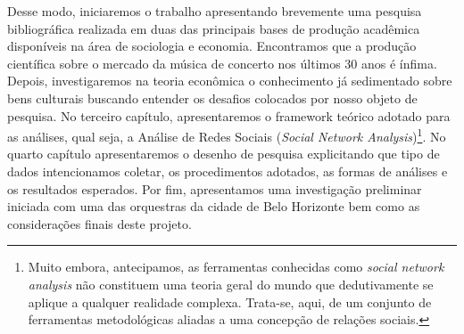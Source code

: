 \documentclass[a4paper, 12pt, openright, oneside, german, french, english, brazil]{abntex2}
\begin{document}
	Desse modo, iniciaremos o trabalho apresentando brevemente uma pesquisa bibliográfica realizada em duas das principais bases de produção acadêmica disponíveis na área de sociologia e economia. Encontramos que a produção científica sobre o mercado da música de concerto nos últimos 30 anos é ínfima. Depois, investigaremos na teoria econômica o conhecimento já sedimentado sobre bens culturais buscando entender os desafios colocados por nosso objeto de pesquisa. No terceiro capítulo, apresentaremos o framework teórico adotado para as análises, qual seja, a Análise de Redes Sociais (\textit{Social Network Analysis})\footnote{Muito embora, antecipamos, as ferramentas conhecidas como \textit{social network analysis} não constituem uma teoria geral do mundo que dedutivamente se aplique a qualquer realidade complexa. Trata-se, aqui, de um conjunto de ferramentas metodológicas aliadas a uma concepção de relações sociais.}. No quarto capítulo apresentaremos o desenho de pesquisa explicitando que tipo de dados intencionamos coletar, os procedimentos adotados, as formas de análises e os resultados esperados. Por fim, apresentamos uma investigação preliminar iniciada com uma das orquestras da cidade de Belo Horizonte bem como as considerações finais deste projeto.






\end{document}
